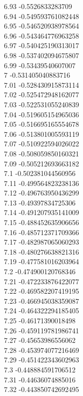 {6.93	-0.5526833283709\\
6.94	-0.549593761082448\\
6.95	-0.546520938978564\\
6.96	-0.543464776963258\\
6.97	-0.540425190313017\\
6.98	-0.537402094675807\\
6.99	-0.53439540607007\\
7	-0.531405040883716\\
7.01	-0.528430915873114\\
7.02	-0.525472948162077\\
7.03	-0.522531055240839\\
7.04	-0.519605154965036\\
7.05	-0.516695165554678\\
7.06	-0.513801005593119\\
7.07	-0.510922594026022\\
7.08	-0.508059850160321\\
7.09	-0.505212693663182\\
7.1	-0.502381044560956\\
7.11	-0.499564823238136\\
7.12	-0.496763950436299\\
7.13	-0.49397834725306\\
7.14	-0.491207935141009\\
7.15	-0.488452635906656\\
7.16	-0.485712371709366\\
7.17	-0.482987065060293\\
7.18	-0.480276638821316\\
7.19	-0.477581016203964\\
7.2	-0.474900120768346\\
7.21	-0.472233876422077\\
7.22	-0.469582207419195\\
7.23	-0.466945038359087\\
7.24	-0.464322294185405\\
7.25	-0.46171390018498\\
7.26	-0.459119781986741\\
7.27	-0.45653986556062\\
7.28	-0.453974077216469\\
7.29	-0.451422343602963\\
7.3	-0.448884591706512\\
7.31	-0.44636074885016\\
7.32	-0.443850742692495\\
}
